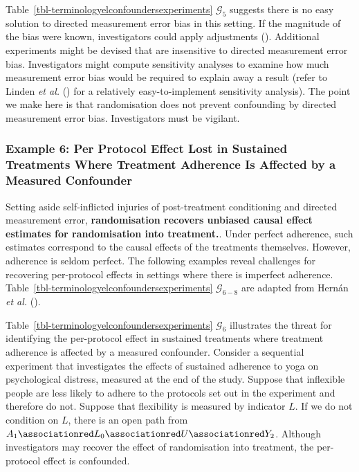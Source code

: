 \documentclass[
  single column]{article}
\begin{document}
Table~\ref{tbl-terminologyelconfoundersexperiments} \(\mathcal{G}_{5}\)
suggests there is no easy solution to directed measurement error bias in
this setting. If the magnitude of the bias were known, investigators
could apply adjustments (). Additional experiments might be devised that are
insensitive to directed measurement error bias. Investigators might
compute sensitivity analyses to examine how much measurement error bias
would be required to explain away a result (refer to Linden \emph{et
al.} () for a relatively
easy-to-implement sensitivity analysis). The point we make here is that
randomisation does not prevent confounding by directed measurement error
bias. Investigators must be vigilant.

\subsubsection{Example 6: Per Protocol Effect Lost in Sustained
Treatments Where Treatment Adherence Is Affected by a Measured
Confounder}\label{example-6-per-protocol-effect-lost-in-sustained-treatments-where-treatment-adherence-is-affected-by-a-measured-confounder}

Setting aside self-inflicted injuries of post-treatment conditioning and
directed measurement error, \textbf{randomisation recovers unbiased
causal effect estimates for randomisation into treatment.}. Under
perfect adherence, such estimates correspond to the causal effects of
the treatments themselves. However, adherence is seldom perfect. The
following examples reveal challenges for recovering per-protocol effects
in settings where there is imperfect adherence.
Table~\ref{tbl-terminologyelconfoundersexperiments}
\(\mathcal{G}_{6-8}\) are adapted from Hernán \emph{et al.}
().

Table~\ref{tbl-terminologyelconfoundersexperiments} \(\mathcal{G}_{6}\)
illustrates the threat for identifying the per-protocol effect in
sustained treatments where treatment adherence is affected by a measured
confounder. Consider a sequential experiment that investigates the
effects of sustained adherence to yoga on psychological distress,
measured at the end of the study. Suppose that inflexible people are
less likely to adhere to the protocols set out in the experiment and
therefore do not. Suppose that flexibility is measured by indicator
\(L\). If we do not condition on \(L\), there is an open path from
\(A_1 \associationred L_0 \associationred U \associationred Y_2\).
Although investigators may recover the effect of randomisation into
treatment, the per-protocol effect is confounded.
\end{document}
